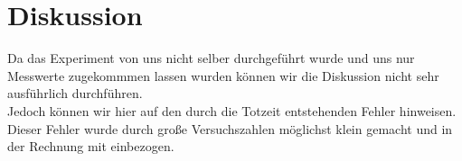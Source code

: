 \section{Diskussion}
Da das Experiment von uns nicht selber durchgeführt wurde und uns nur Messwerte zugekommmen
lassen wurden können wir die Diskussion nicht sehr ausführlich durchführen.\\
Jedoch können wir hier auf den durch die Totzeit entstehenden Fehler hinweisen. 
Dieser Fehler wurde durch große Versuchszahlen möglichst klein gemacht und in der Rechnung mit einbezogen.